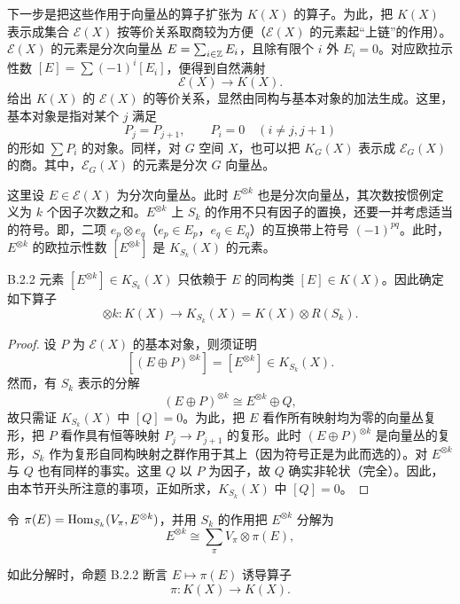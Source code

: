 下一步是把这些作用于向量丛的算子扩张为 $K(X)$ 的算子。为此，把 $K(X)$ 表示成集合 $\mathcal{E}(X)$ 按等价关系取商较为方便（$\mathcal{E}(X)$ 的元素起“上链”的作用）。$\mathcal{E}(X)$ 的元素是分次向量丛 $E=\sum_{i\in\mathbb{Z}}E_i$，且除有限个 $i$ 外 $E_i=0$。对应欧拉示性数 $[E]=\sum(-1)^i[E_i]$，便得到自然满射
\[
\mathcal{E}(X)\longrightarrow K(X).
\]
给出 $K(X)$ 的 $\mathcal{E}(X)$ 的等价关系，显然由同构与基本对象的加法生成。这里，基本对象是指对某个 $j$ 满足
\[
P_j=P_{j+1},\qquad P_i=0\quad(i\ne j,j+1)
\]
的形如 $\sum P_i$ 的对象。同样，对 $G$ 空间 $X$，也可以把 $K_G(X)$ 表示成 $\mathcal{E}_G(X)$ 的商。其中，$\mathcal{E}_G(X)$ 的元素是分次 $G$ 向量丛。

这里设 $E\in\mathcal{E}(X)$ 为分次向量丛。此时 $E^{\otimes k}$ 也是分次向量丛，其次数按惯例定义为 $k$ 个因子次数之和。$E^{\otimes k}$ 上 $S_k$ 的作用不只有因子的置换，还要一并考虑适当的符号。即，二项 $e_p\otimes e_q$（$e_p\in E_p$，$e_q\in E_q$）的互换带上符号 $(-1)^{pq}$。此时，$E^{\otimes k}$ 的欧拉示性数 $[E^{\otimes k}]$ 是 $K_{S_k}(X)$ 的元素。


\begin{proposition*}{B.2.2}
  元素 $[E^{\otimes k}]\in K_{S_k}(X)$ 只依赖于 $E$ 的同构类 $[E]\in K(X)$。因此确定如下算子
  \[
  \otimes k\colon K(X)\longrightarrow K_{S_k}(X)=K(X)\otimes R(S_k).
  \]
\end{proposition*}

\begin{proof}
  设 $P$ 为 $\mathcal{E}(X)$ 的基本对象，则须证明
  \[
  [(E\oplus P)^{\otimes k}]=[E^{\otimes k}]\in K_{S_k}(X).
  \]
  然而，有 $S_k$ 表示的分解
  \[
  (E\oplus P)^{\otimes k}\cong E^{\otimes k}\oplus Q,
  \]
  故只需证 $K_{S_k}(X)$ 中 $[Q]=0$。为此，把 $E$ 看作所有映射均为零的向量丛复形，把 $P$ 看作具有恒等映射 $P_j\to P_{j+1}$ 的复形。此时 $(E\oplus P)^{\otimes k}$ 是向量丛的复形，$S_k$ 作为复形自同构映射之群作用于其上（因为符号正是为此而选的）。对 $E^{\otimes k}$ 与 $Q$ 也有同样的事实。这里 $Q$ 以 $P$ 为因子，故 $Q$ 确实非轮状（完全）。因此，由本节开头所注意的事项，正如所求，$K_{S_k}(X)$ 中 $[Q]=0$。
\end{proof}

\begin{remark}{}
  令 $\pi(E)=\operatorname{Hom}_{S_k}(V_\pi,E^{\otimes k})$，并用 $S_k$ 的作用把 $E^{\otimes k}$ 分解为
  \[
  E^{\otimes k}\cong\sum_{\pi}V_\pi\otimes\pi(E),
  \]

如此分解时，命题 B.2.2 断言 $E\mapsto\pi(E)$ 诱导算子
\[
\pi\colon K(X)\longrightarrow K(X).
\]
\end{remark}

